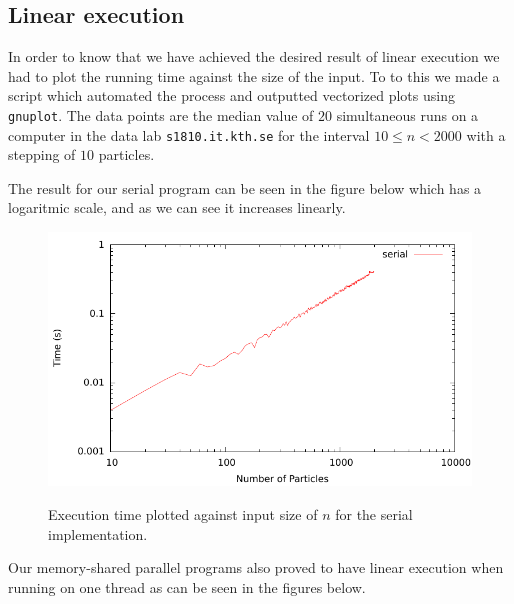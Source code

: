 
\subsection{Linear execution}

In order to know that we have achieved the desired result of linear execution we
had to plot the running time against the size of the input. To to this we made a
script which automated the process and outputted vectorized plots using
\texttt{gnuplot}. The data points are the median value of $20$ simultaneous runs
on a computer in the data lab \texttt{s1810.it.kth.se} for the interval $10 \leq
n < 2000$ with a stepping of $10$ particles.

The result for our serial program can be seen in the figure below which has a
logaritmic scale, and as we can see it increases linearly.

\begin{figure}[H]
	\includegraphics{plots/serial.pdf}
	\label{serial_linear}
	\caption{Execution time plotted against input size of $n$ for the serial implementation.}
\end{figure}

Our memory-shared parallel programs also proved to have linear execution when running on one thread as can be seen in the figures below.

